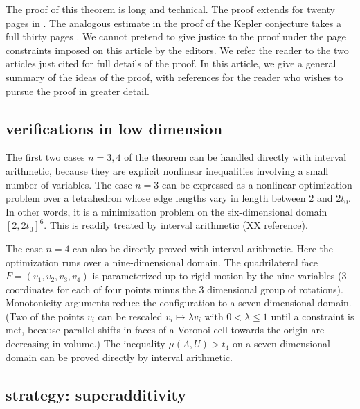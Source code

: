 The proof of this theorem is long and technical.  The proof extends for 
twenty pages in  \cite[pp.19-38]{arx}.  The analogous estimate in
the proof of the Kepler conjecture takes a full thirty pages 
\cite[pp.126-156]{DCG}.
We cannot pretend to give justice to the proof under the page constraints
imposed on this article by the editors.  We refer the reader to the
two articles just cited for full details of the proof.  In this article,
we give a general summary of the ideas of the proof, with 
references for the reader who wishes to pursue the proof in greater detail.

\subsection{verifications in low dimension}

The first two cases $n=3,4$ of the theorem can be handled directly with
interval arithmetic, because they are explicit nonlinear 
inequalities involving a small number of variables.  The case $n=3$ can
be expressed as a nonlinear optimization problem over a tetrahedron
whose edge lengths vary in length between $2$ and $2t_0$.  In other
words, it is a minimization problem on the six-dimensional 
domain $[2,2t_0]^6$. This is readily treated by interval arithmetic (XX reference).  

The case $n=4$ can also be directly proved with interval arithmetic.  
Here the optimization runs over a nine-dimensional domain.  The
quadrilateral face $F=(v_1,v_2,v_3,v_4)$ is parameterized up to rigid
motion by the nine variables (3 coordinates for each of four points
minus the 3 dimensional group of rotations).  Monotonicity arguments
reduce the configuration to a seven-dimensional domain.  (Two of the
points $v_i$ can be rescaled $v_i \mapsto \lambda v_i$ with $0 < \lambda \le 1$ until a constraint is met, 
because parallel shifts in faces of a Voronoi cell towards the origin are decreasing in volume.)  The inequality $\mu(\Lambda,U)> t_4$ on
a seven-dimensional domain can be proved directly by interval arithmetic.

\subsection{strategy: superadditivity}

